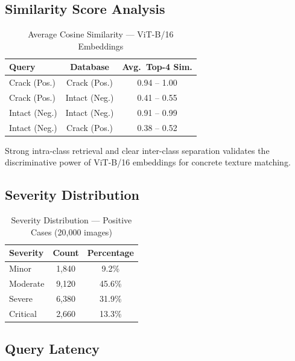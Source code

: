 \documentclass[conference]{IEEEtran}
\begin{document}
\subsection{Similarity Score Analysis}

\begin{table}[H]
  \caption{Average Cosine Similarity --- ViT-B/16 Embeddings}
  \label{tab:sim_results}
  \centering
  \renewcommand{\arraystretch}{1.2}
  \begin{tabular}{lcc}
    \toprule
    \textbf{Query} & \textbf{Database} & \textbf{Avg.\ Top-4 Sim.} \\
    \midrule
    Crack (Pos.)   & Crack (Pos.)   & 0.94 -- 1.00 \\
    Crack (Pos.)   & Intact (Neg.)  & 0.41 -- 0.55 \\
    Intact (Neg.)  & Intact (Neg.)  & 0.91 -- 0.99 \\
    Intact (Neg.)  & Crack (Pos.)   & 0.38 -- 0.52 \\
    \bottomrule
  \end{tabular}
\end{table}

Strong intra-class retrieval and clear inter-class separation validates the discriminative power of ViT-B/16 embeddings for concrete texture matching.

\subsection{Severity Distribution}

\begin{table}[H]
  \caption{Severity Distribution --- Positive Cases (20,000 images)}
  \label{tab:severity_dist}
  \centering
  \renewcommand{\arraystretch}{1.2}
  \begin{tabular}{lcc}
    \toprule
    \textbf{Severity} & \textbf{Count} & \textbf{Percentage} \\
    \midrule
    Minor    & 1,840 & 9.2\%  \\
    Moderate & 9,120 & 45.6\% \\
    Severe   & 6,380 & 31.9\% \\
    Critical & 2,660 & 13.3\% \\
    \bottomrule
  \end{tabular}
\end{table}

\subsection{Query Latency}
\end{document}
